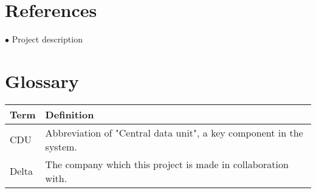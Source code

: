 \section{References}
$\bullet$ Project description

\section{Glossary}
\begin{table}[H]
\centering
\begin{tabular}{|p{4cm}|p{7cm}|}
\hline
Term & Definition\\ \hline
CDU & Abbreviation of "Central data unit", a key component in the system. \\ \hline
Delta & The company which this project is made in collaboration with.\\ \hline
\end{tabular}
\end{table}